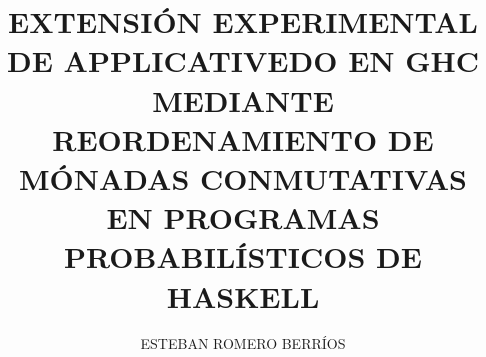
\author{ESTEBAN ROMERO BERRÍOS}

\title{EXTENSIÓN EXPERIMENTAL DE APPLICATIVEDO EN GHC 
  MEDIANTE REORDENAMIENTO DE MÓNADAS CONMUTATIVAS EN 
  PROGRAMAS PROBABILÍSTICOS DE HASKELL
}






